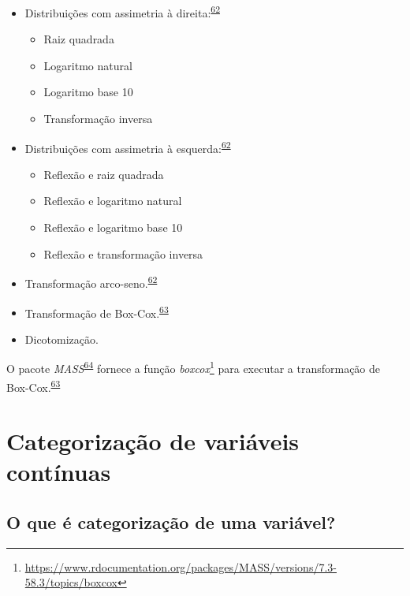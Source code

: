 \documentclass[
  a4paper,
]{book}
\renewcommand{\href}[2]{#2\footnote{\url{#1}}}
\newenvironment{infobox}[1]
  {
  \begin{itemize}
  \renewcommand{\labelitemi}{
    \raisebox{-.7\height}[0pt][0pt]{
      {\setkeys{Gin}{width=3em,keepaspectratio}
        \texttt{[image: \#1]}}
    }
  }
  \setlength{\fboxsep}{1em}
  \begin{blackbox}
  \item
  }
  {
  \end{blackbox}
  \end{itemize}
  }
\begin{document}
\begin{itemize}
\item
  Distribuições com assimetria à direita:\textsuperscript{\protect\hyperlink{ref-osborne2010}{62}}

  \begin{itemize}
  \item
    Raiz quadrada
  \item
    Logaritmo natural
  \item
    Logaritmo base 10
  \item
    Transformação inversa
  \end{itemize}
\item
  Distribuições com assimetria à esquerda:\textsuperscript{\protect\hyperlink{ref-osborne2010}{62}}

  \begin{itemize}
  \item
    Reflexão e raiz quadrada
  \item
    Reflexão e logaritmo natural
  \item
    Reflexão e logaritmo base 10
  \item
    Reflexão e transformação inversa
  \end{itemize}
\item
  Transformação arco-seno.\textsuperscript{\protect\hyperlink{ref-osborne2010}{62}}
\item
  Transformação de Box-Cox.\textsuperscript{\protect\hyperlink{ref-box1964}{63}}
\item
  Dicotomização.
\end{itemize}

\begin{infobox}{images/Rlogo}
O pacote \emph{MASS}\textsuperscript{\protect\hyperlink{ref-MASS}{64}} fornece a função \href{https://www.rdocumentation.org/packages/MASS/versions/7.3-58.3/topics/boxcox}{\emph{boxcox}} para executar a transformação de Box-Cox.\textsuperscript{\protect\hyperlink{ref-box1964}{63}}

\end{infobox}

\hypertarget{categorizacao}{%
\section{Categorização de variáveis contínuas}\label{categorizacao}}

\hypertarget{o-que-uxe9-categorizauxe7uxe3o-de-uma-variuxe1vel}{%
\subsection{O que é categorização de uma variável?}\label{o-que-uxe9-categorizauxe7uxe3o-de-uma-variuxe1vel}}
\end{document}
